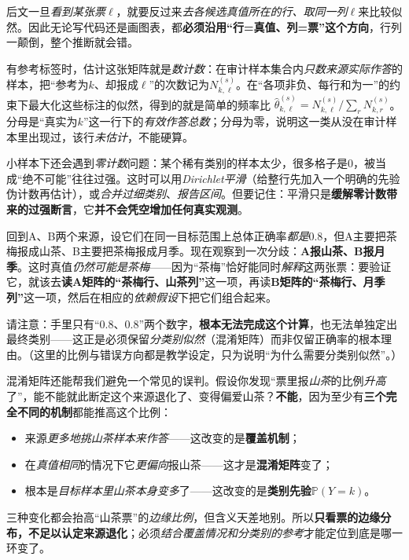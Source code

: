 后文一旦\emph{看到某张票}$\ell$，就要反过来\emph{去各候选真值所在的行、取同一列}$\ell$来比较似然。因此无论写代码还是画图表，都\textbf{必须沿用“行=真值、列=票”这个方向}，行列一颠倒，整个推断就会错。

有参考标签时，估计这张矩阵就是\emph{数计数}：在审计样本集合内\emph{只数来源实际作答}的样本，把“参考为$k$、却报成$\ell$”的次数记为$N^{(s)}_{k,\ell}$。在“各项非负、每行和为一”的约束下最大化这些标注的似然，得到的就是简单的频率比
$\widehat\theta^{(s)}_{k,\ell}=N^{(s)}_{k,\ell}/\sum_rN^{(s)}_{k,r}$。
分母是“真实为$k$”这一行下的\emph{有效作答总数}；分母为零，说明这一类从没在审计样本里出现过，该行\emph{未估计}，不能硬算。

小样本下还会遇到\emph{零计数}问题：某个稀有类别的样本太少，很多格子是$0$，被当成“绝不可能”往往过强。这时可以用\emph{Dirichlet平滑}（给整行先加入一个明确的先验伪计数再估计），或\emph{合并过细类别}、\emph{报告区间}。但要记住：平滑只是\textbf{缓解零计数带来的过强断言}，它\textbf{并不会凭空增加任何真实观测}。

回到A、B两个来源，设它们在同一目标范围上总体正确率\emph{都是}$0.8$，但A主要把茶梅报成山茶、B主要把茶梅报成月季。现在观察到一次分歧：\textbf{A报山茶、B报月季}。这时真值\emph{仍然可能是茶梅}——因为“茶梅”恰好能同时\emph{解释}这两张票：要验证它，就该去\textbf{读A矩阵的“茶梅行、山茶列”}这一项，再读\textbf{B矩阵的“茶梅行、月季列”}这一项，然后在相应的\emph{依赖假设}下把它们组合起来。

请注意：手里只有“$0.8$、$0.8$”两个数字，\textbf{根本无法完成这个计算}，也无法单独定出最终类别——这正是必须保留\emph{分类别似然}（混淆矩阵）而非仅留正确率的根本理由。（这里的比例与错误方向都是教学设定，只为说明“为什么需要分类别似然”。）

混淆矩阵还能帮我们避免一个常见的误判。假设你发现“票里报\emph{山茶}的比例\emph{升高}了”，能不能就此断定这个来源退化了、变得偏爱山茶？\textbf{不能}，因为至少有\textbf{三个完全不同的机制}都能推高这个比例：
\begin{itemize}\item 来源\emph{更多地挑山茶样本来作答}——这改变的是\textbf{覆盖机制}；\item 在\emph{真值相同}的情况下它\emph{更偏向}报山茶——这才是\textbf{混淆矩阵}变了；\item 根本是\emph{目标样本里山茶本身变多}了——这改变的是\textbf{类别先验}$\mathbb{P}(Y=k)$。\end{itemize}
三种变化都会抬高“山茶票”的\emph{边缘比例}，但含义天差地别。所以\textbf{只看票的边缘分布，不足以认定来源退化}；必须\emph{结合覆盖情况和分类别的参考}才能定位到底是哪一环变了。

